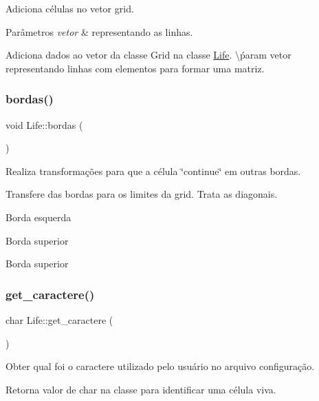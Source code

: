 Adiciona células no vetor grid. 
\begin{DoxyParams}{Parâmetros}
{\em vetor} & representando as linhas.\\
\hline
\end{DoxyParams}
Adiciona dados ao vetor da classe Grid na classe \hyperlink{classLife}{Life}. \textbackslash{}ṕaram vetor representando linhas com elementos para formar uma matriz. \mbox{\label{classLife_a80aac6b6b00f8cf0589207953f3f844b}} 
\subsubsection{\texorpdfstring{bordas()}{bordas()}}
{\footnotesize\ttfamily void Life\+::bordas (\begin{DoxyParamCaption}{ }\end{DoxyParamCaption})}



Realiza transformações para que a célula \char`\"{}continue\char`\"{} em outras bordas. 

Transfere das bordas para os limites da grid. Trata as diagonais.

Borda esquerda

Borda superior

Borda superior \mbox{\label{classLife_a21ada75e45a4a244eeab403fb34534fe}} 
\subsubsection{\texorpdfstring{get\+\_\+caractere()}{get\_caractere()}}
{\footnotesize\ttfamily char Life\+::get\+\_\+caractere (\begin{DoxyParamCaption}{ }\end{DoxyParamCaption})}

Obter qual foi o caractere utilizado pelo usuário no arquivo configuração. \begin{DoxyReturn}{Retorna}
valor de char na classe para identificar uma célula viva. 
\end{DoxyReturn}
\mbox{\label{classLife_ac82f1ba83db36b3142ec12c2fc334de3}} 

